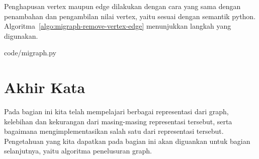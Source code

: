 Penghapusan vertex maupun edge dilakukan dengan cara yang sama dengan penambahan dan pengambilan nilai vertex, yaitu sesuai dengan semantik python. Algoritma~\ref{algo:migraph-remove-vertex-edge} menunjukkan langkah yang digunakan.


                {code/migraph.py}

\section{Akhir Kata}

Pada bagian ini kita telah mempelajari berbagai representasi dari graph, kelebihan dan kekurangan dari masing-masing representasi tersebut, serta bagaimana mengimplementasikan salah satu dari representasi tersebut. Pengetahuan yang kita dapatkan pada bagian ini akan diguankan untuk bagian selanjutnya, yaitu algoritma penelusuran graph.
